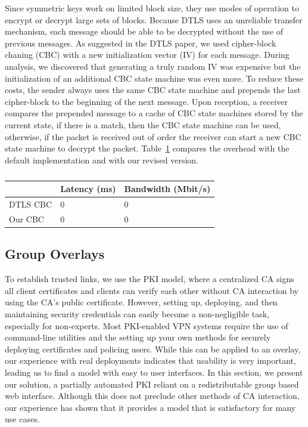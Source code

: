 \documentclass[conference]{IEEEtran}
\begin{document}
Since symmetric keys work on limited block size, they use modes of operation
to encrypt or decrypt large sets of blocks.  Because DTLS uses an unreliable
transfer mechanism, each message should be able to be decrypted without the use
of previous messages.  As suggested in the DTLS paper, we used cipher-block
chaning (CBC) with a new initialization vector (IV) for each message.  During
analysis, we discovered that generating a truly random IV was expensive but the
initialization of an additional CBC state machine was even more.  To reduce
these costs, the sender always uses the same CBC state machine and prepends
the last cipher-block to the beginning of the next message.  Upon reception,
a receiver compares the prepended message to a cache of CBC state machines
stored by the current state, if there is a match, then the CBC state machine
can be used, otherwise, if the packet is received out of order the receiver
can start a new CBC state machine to decrypt the packet.  Table~\ref{tab:cbc_issue}
compares the overhead with the default implementation and with our revised
version.

\begin{table}[ht]
\setlength{\itemsep}{0pt}
\setlength{\parskip}{0pt}
\centering
\begin{tabular}[c]{|m{1.5cm}||m{3cm}|m{3cm}|} \hline
& Latency (ms) & Bandwidth (Mbit/s) \\ \hline\hline
DTLS CBC & 0 & 0 \\ \hline
Our CBC & 0 & 0 \\ \hline
\end{tabular}
\caption{}
\label{tab:cbc_issue}
\end{table}

\subsection{Group Overlays}
\label{group_overlays}
To establish trusted links, we use the PKI model, where a centralized CA signs
all client certificates and clients can verify each other without CA interaction
by using the CA's public certificate.  However, setting up, deploying, and then
maintaining security credentials can easily become a non-negligible task,
especially for non-experts.  Most PKI-enabled VPN systems require the use of
command-line utilities and the setting up your own methods for securely
deploying certificates and policing users.  While this can be applied to an
overlay, our experience with real deployments indicates that usability is very
important, leading us to find a model with easy to user interfaces.
In this section, we present our solution, a partially automated PKI reliant on
a redistributable group based web interface.  Although this does not preclude
other methods of CA interaction, our experience has shown that it provides a
model that is satisfactory for many use cases.
\end{document}
